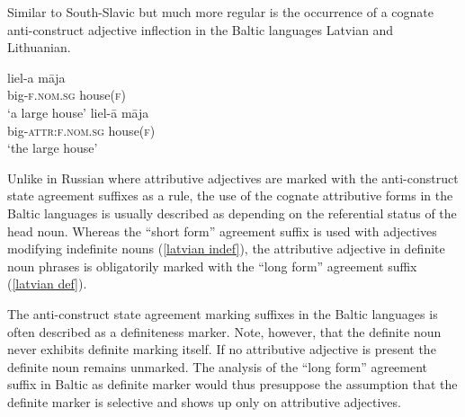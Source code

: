 Similar to South-Slavic but much more regular is the occurrence of a cognate anti-construct adjective inflection in the Baltic languages Latvian and Lithuanian.
\begin{exe}
\ex
{}
\begin{xlist}
\ex	\label{latvian indef}
\gll liel-a māja\\
	big-\textsc{f.nom.sg} house(\textsc{f})\\
\glt	‘a large house’
\ex	\label{latvian def}
\gll liel-ā māja\\
	big-\textsc{attr:f.nom.sg} house(\textsc{f})\\
\glt	‘the large house’
\end{xlist}
\end{exe}
Unlike in Russian where attributive adjectives are marked with the anti-construct state agreement suffixes as a rule, the use of the cognate attributive forms in the Baltic languages is usually described as depending on the referential status of the head noun. Whereas the “short form” agreement suffix is used with adjectives modifying indefinite nouns (\ref{latvian indef}), the attributive adjective in definite noun phrases is obligatorily marked with the “long form” agreement suffix (\ref{latvian def}).

The anti-construct state agreement marking suffixes in the Baltic languages is often described as a definiteness marker. Note, however, that the definite noun never exhibits definite marking itself. If no attributive adjective is present the definite noun remains unmarked. The analysis of the “long form” agreement suffix in Baltic as definite marker would thus presuppose the assumption that the definite marker is selective and shows up only on attributive adjectives. 

